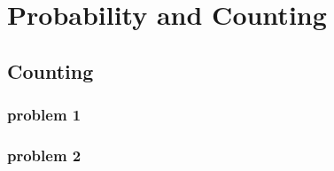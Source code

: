 \chapter{Probability and Counting}
\label{ch:pac}
\ifdefined\HCode
\else
{
\startcontents[chapter]
}
\fi
  \section{Counting}
  
  \subsection{problem 1}
  

  \subsection{problem 2}
  

\ifdefined\HCode
{}
\fi

\ifdefined\HCode
\else
{
\stopcontents[chapter]
}
\fi